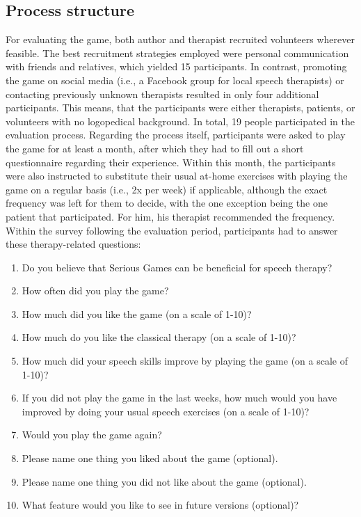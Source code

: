 \documentclass[draft,final]{vutinfth} %
\begin{document}
\subsection{Process structure}
For evaluating the game, both author and therapist recruited volunteers wherever feasible. The best recruitment strategies employed were personal communication with friends and relatives, which yielded 15 participants. In contrast, promoting the game on social media (i.e., a Facebook group for local speech therapists) or contacting previously unknown therapists resulted in only four additional participants. This means, that the participants  were either therapists, patients, or volunteers with no logopedical background. In total, 19 people participated in the evaluation process. Regarding the process itself, participants were asked to play the game for at least a month, after which they had to fill out a short questionnaire regarding their experience. Within this month, the participants were also instructed to substitute their usual at-home exercises with playing the game on a regular basis (i.e., 2x per week) if applicable, although the exact frequency was left for them to decide, with the one exception being the one patient that participated. For him, his therapist recommended the frequency. \\
Within the survey following the evaluation period, participants had to answer these therapy-related questions:
\begin{enumerate}
\item Do you believe that Serious Games can be beneficial for speech therapy?
\item How often did you play the game?
\item How much did you like the game (on a scale of 1-10)?
\item How much do you like the classical therapy (on a scale of 1-10)?
\item How much did your speech skills improve by playing the game (on a scale of 1-10)?
\item If you did not play the game in the last weeks, how much would you have improved by doing your usual speech exercises (on a scale of 1-10)?
\item Would you play the game again?
\item Please name one thing you liked about the game (optional).
\item Please name one thing you did not like about the game (optional).
\item What feature would you like to see in future versions (optional)?
\end{enumerate}
\end{document}
